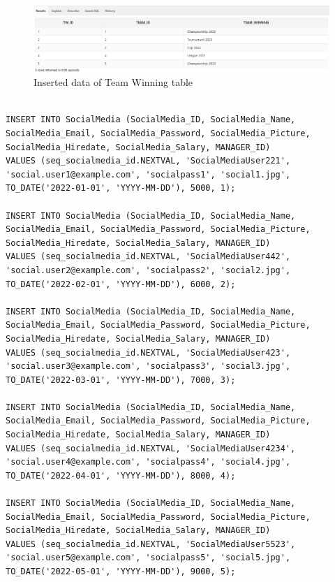 \begin{figure}[H]
    \centering
    \includegraphics[width=1\textwidth]{images/TableData/TEAM_WINNING.png}
    \caption{Inserted data of Team Winning table}
\end{figure}

\begin{lstlisting}[caption={Inserting data into SocialMedia tables},label={lst:insert_SocialMedia}]

INSERT INTO SocialMedia (SocialMedia_ID, SocialMedia_Name, SocialMedia_Email, SocialMedia_Password, SocialMedia_Picture, SocialMedia_Hiredate, SocialMedia_Salary, MANAGER_ID)
VALUES (seq_socialmedia_id.NEXTVAL, 'SocialMediaUser221', 'social.user1@example.com', 'socialpass1', 'social1.jpg', TO_DATE('2022-01-01', 'YYYY-MM-DD'), 5000, 1);

INSERT INTO SocialMedia (SocialMedia_ID, SocialMedia_Name, SocialMedia_Email, SocialMedia_Password, SocialMedia_Picture, SocialMedia_Hiredate, SocialMedia_Salary, MANAGER_ID)
VALUES (seq_socialmedia_id.NEXTVAL, 'SocialMediaUser442', 'social.user2@example.com', 'socialpass2', 'social2.jpg', TO_DATE('2022-02-01', 'YYYY-MM-DD'), 6000, 2);

INSERT INTO SocialMedia (SocialMedia_ID, SocialMedia_Name, SocialMedia_Email, SocialMedia_Password, SocialMedia_Picture, SocialMedia_Hiredate, SocialMedia_Salary, MANAGER_ID)
VALUES (seq_socialmedia_id.NEXTVAL, 'SocialMediaUser423', 'social.user3@example.com', 'socialpass3', 'social3.jpg', TO_DATE('2022-03-01', 'YYYY-MM-DD'), 7000, 3);

INSERT INTO SocialMedia (SocialMedia_ID, SocialMedia_Name, SocialMedia_Email, SocialMedia_Password, SocialMedia_Picture, SocialMedia_Hiredate, SocialMedia_Salary, MANAGER_ID)
VALUES (seq_socialmedia_id.NEXTVAL, 'SocialMediaUser4234', 'social.user4@example.com', 'socialpass4', 'social4.jpg', TO_DATE('2022-04-01', 'YYYY-MM-DD'), 8000, 4);

INSERT INTO SocialMedia (SocialMedia_ID, SocialMedia_Name, SocialMedia_Email, SocialMedia_Password, SocialMedia_Picture, SocialMedia_Hiredate, SocialMedia_Salary, MANAGER_ID)
VALUES (seq_socialmedia_id.NEXTVAL, 'SocialMediaUser5523', 'social.user5@example.com', 'socialpass5', 'social5.jpg', TO_DATE('2022-05-01', 'YYYY-MM-DD'), 9000, 5);

\end{lstlisting}

